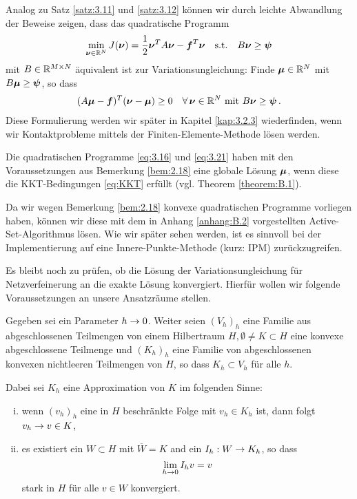 \begin{bem}\label{bem:3.13}
Analog zu Satz \ref{satz:3.11} und \ref{satz:3.12} können wir durch leichte Abwandlung der Beweise zeigen, dass das quadratische Programm
\begin{align}\label{eq:3.21}
	\min_{\boldsymbol\nu \in \mathbb{R}^N} J(\boldsymbol\nu) = \frac 1 2 \boldsymbol \nu^T A \boldsymbol \nu - \boldsymbol f^T \boldsymbol \nu \quad \text{s.t.} \quad B\boldsymbol\nu \ge \boldsymbol \psi
\end{align}
mit $B \in \mathbb{R}^{M\times N}$ äquivalent ist zur Variationsungleichung: Finde $\boldsymbol\mu \in \mathbb{R}^N$ mit $B\boldsymbol\mu \ge \boldsymbol \psi$, so dass
\begin{align}\label{eq:3.22}
	(A\boldsymbol\mu - \boldsymbol f)^T (\boldsymbol\nu-\boldsymbol\mu) \ge 0 \quad \forall\, \boldsymbol\nu \in \mathbb{R}^N \text{ mit } B \boldsymbol \nu \ge \boldsymbol\psi \, .
\end{align}
Diese Formulierung werden wir später in Kapitel \ref{kap:3.2.3} wiederfinden, wenn wir Kontaktprobleme mittels der Finiten-Elemente-Methode lösen werden.
\end{bem}


\begin{bem}\label{bem:3.14}
Die quadratischen Programme \eqref{eq:3.16} und \eqref{eq:3.21} haben mit den Voraussetzungen aus Bemerkung \ref{bem:2.18} eine globale Lösung $\boldsymbol\mu$, wenn diese die KKT-Bedingungen \eqref{eq:KKT} erfüllt (vgl. Theorem \ref{theorem:B.1}).
\end{bem}


Da wir wegen Bemerkung \ref{bem:2.18} konvexe quadratischen Programme vorliegen haben, können wir diese mit dem in Anhang \ref{anhang:B.2} vorgestellten Active-Set-Algorithmus lösen. Wie wir später sehen werden, ist es sinnvoll bei der Implementierung auf eine Innere-Punkte-Methode (kurz: IPM) zurückzugreifen.

Es bleibt noch zu prüfen, ob die Lösung der Variationsungleichung für Netzverfeinerung an die exakte Lösung konvergiert. Hierfür wollen wir folgende Voraussetzungen an unsere Ansatzräume stellen.


\begin{vor}\label{vor:3.15}
Gegeben sei ein Parameter $h \rightarrow 0$. Weiter seien $(V_h)_h$ eine Familie aus abgeschlossenen Teilmengen von einem Hilbertraum $H, \emptyset \not= K \subset H$ eine konvexe abgeschlossene Teilmenge und $(K_h)_h$ eine Familie von abgeschlossenen konvexen nichtleeren Teilmengen von $H$, so dass $K_h \subset V_h$ für alle $h$.

Dabei sei $K_h$ eine Approximation von $K$ im folgenden Sinne:
\begin{enumerate}[(i)]
\item wenn $(v_h)_h$ eine in $H$ beschränkte Folge mit $v_h \in K_h$ ist, dann folgt $v_h \rightarrow v \in K$,
\item es existiert ein $W \subset H$ mit $\overline W = K$ and ein $I_h: W \rightarrow K_h$, so dass
\[
	\lim_{h\rightarrow 0} I_h v = v
\]
stark in $H$ für alle $v \in W$ konvergiert.
\end{enumerate}
\end{vor}


